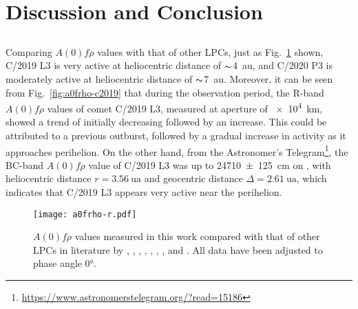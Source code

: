 \section{Discussion and Conclusion}\label{sec:dis}

\subsection{}
Comparing $A(0)f\rho$ values with that of other LPCs, just as Fig.~\ref{fig:afrho-ref} shown, C/2019 L3 is very active at heliocentric distance of $\thicksim${\qty{4}{\astronomicalunit}}, and C/2020 P3 is moderately active at heliocentric distance of $\thicksim${\qty{7}{\astronomicalunit}}. 
Moreover, %
it can be seen from Fig.~\ref{fig:a0frho-c2019} that during the observation period, the R-band $A(0)f\rho$ values of comet C/2019 L3, measured at aperture of {\qty{e4}{\km}}, showed a trend of initially decreasing followed by an increase. This could be attributed to a previous outburst, followed by a gradual increase in activity as it approaches perihelion. 
On the other hand, from the Astronomer's Telegram\footnote{\url{https://www.astronomerstelegram.org/?read=15186}}, the BC-band $A(0)f\rho$ value of C/2019 L3 was up to \qty{24710 +- 125}{\cm} on , with heliocentric distance $r = \qty{3.56}{\astronomicalunit}$ and geocentric distance $\Delta = \qty{2.61}{\astronomicalunit}$, which indicates that C/2019 L3 appears very active near the perihelion. 


\begin{figure}
    \centering
    \texttt{[image: a0frho-r.pdf]}
    \caption{$A(0)f\rho$ values measured in this work compared with that of other LPCs in  literature by \citet{mazzotta_epifani_observational_2014}, \citet{garcia_photometry_2021}, \citet{garcia_observational_2020}, \citet{rousselot_monitoring_2014}, \citet{meech_activity_2009}, \citet{sarneczky_activity_2016}, \citet{solontoi_ensemble_2012}, and \citet{szabo_spectrophotometry_2002}. All data have been adjusted to phase angle \ang{0}. }\label{fig:afrho-ref}
\end{figure}%

